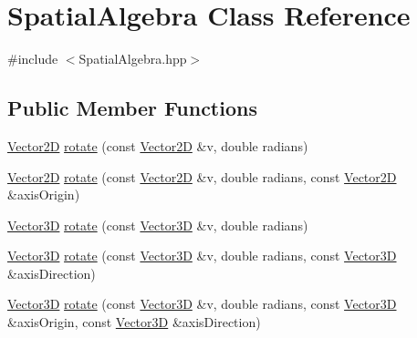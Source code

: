 \hypertarget{class_spatial_algebra}{\section{Spatial\-Algebra Class Reference}
\label{class_spatial_algebra}
}


{\ttfamily \#include $<$Spatial\-Algebra.\-hpp$>$}

\subsection*{Public Member Functions}
\begin{DoxyCompactItemize}
\item 
\hyperlink{class_vector2_d}{Vector2\-D} \hyperlink{class_spatial_algebra_a8de70eeeae01a52c1288af9ee37b83a5}{rotate} (const \hyperlink{class_vector2_d}{Vector2\-D} \&v, double radians)
\item 
\hyperlink{class_vector2_d}{Vector2\-D} \hyperlink{class_spatial_algebra_a2206649b5e46b8ee63b9fb015caf00cf}{rotate} (const \hyperlink{class_vector2_d}{Vector2\-D} \&v, double radians, const \hyperlink{class_vector2_d}{Vector2\-D} \&axis\-Origin)
\item 
\hyperlink{class_vector3_d}{Vector3\-D} \hyperlink{class_spatial_algebra_aa02770400f68ff5cd1fb635d6d0469b4}{rotate} (const \hyperlink{class_vector3_d}{Vector3\-D} \&v, double radians)
\item 
\hyperlink{class_vector3_d}{Vector3\-D} \hyperlink{class_spatial_algebra_a60a11a4fc8561f068cc444b5c04416f3}{rotate} (const \hyperlink{class_vector3_d}{Vector3\-D} \&v, double radians, const \hyperlink{class_vector3_d}{Vector3\-D} \&axis\-Direction)
\item 
\hyperlink{class_vector3_d}{Vector3\-D} \hyperlink{class_spatial_algebra_a88239afd1f8188282ad623a0f9a31806}{rotate} (const \hyperlink{class_vector3_d}{Vector3\-D} \&v, double radians, const \hyperlink{class_vector3_d}{Vector3\-D} \&axis\-Origin, const \hyperlink{class_vector3_d}{Vector3\-D} \&axis\-Direction)
\end{DoxyCompactItemize}


